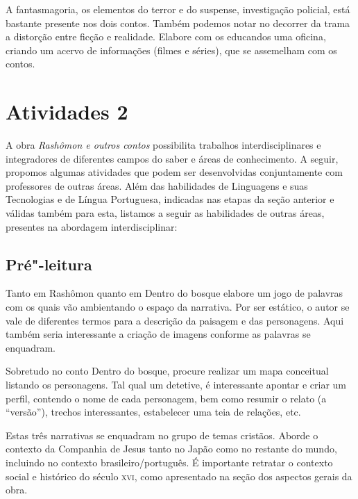 \documentclass[12pt]{extarticle}
\begin{document}

A fantasmagoria, os elementos do terror e do suspense, investigação
policial, está bastante presente nos dois contos. Também podemos notar
no decorrer da trama a distorção entre ficção e realidade. Elabore com
os educandos uma oficina, criando um acervo de informações (filmes e
séries), que se assemelham com os contos.


\section{Atividades 2}

A obra \emph{Rashômon e outros contos} possibilita trabalhos
interdisciplinares e integradores de diferentes campos do saber e áreas
de conhecimento. A seguir, propomos algumas atividades que podem ser
desenvolvidas conjuntamente com professores de outras áreas. Além das
habilidades de Linguagens e suas Tecnologias e de Língua Portuguesa,
indicadas nas etapas da seção anterior e válidas também para esta,
listamos a seguir as habilidades de outras áreas, presentes na abordagem
interdisciplinar:



\subsection{Pré"-leitura}

Tanto em Rashômon quanto em Dentro do bosque elabore um jogo
de palavras com os quais vão ambientando o espaço da narrativa. Por ser
estático, o autor se vale de diferentes termos para a descrição da
paisagem e das personagens. Aqui também seria interessante a criação de
imagens conforme as palavras se enquadram.

Sobretudo no conto Dentro do bosque, procure realizar um mapa conceitual
listando os personagens. Tal qual um detetive, é interessante apontar e
criar um perfil, contendo o nome de cada personagem, bem como resumir o
relato (a ``versão''), trechos interessantes, estabelecer uma teia de
relações, etc.

Estas três narrativas se enquadram no grupo de temas cristãos. Aborde o
contexto da Companhia de Jesus tanto no Japão como no restante do mundo,
incluindo no contexto brasileiro/português. É importante retratar o
contexto social e histórico do século \textsc{xvi}, como apresentado na seção dos
aspectos gerais da obra.
\end{document}
